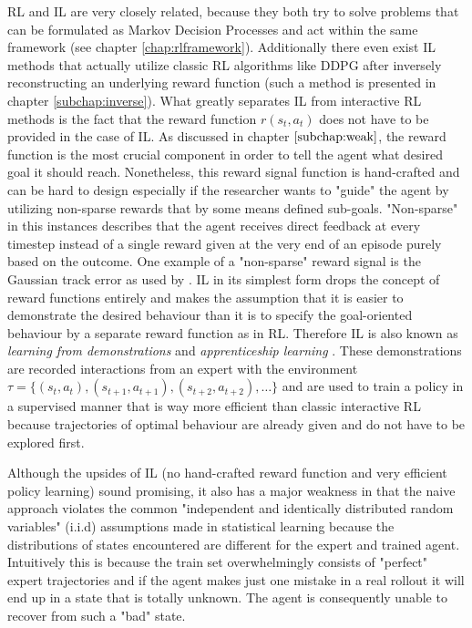 \par
RL and IL are very closely related, because they both try to solve problems that can be formulated as Markov Decision Processes and act within the same framework (see chapter \ref{chap:rlframework}). Additionally there even exist IL methods that actually utilize classic RL algorithms like DDPG after inversely reconstructing an underlying reward function (such a method is presented in chapter \ref{subchap:inverse}). What greatly separates IL from interactive RL methods is the fact that the reward function $r(s_t, a_t)$ does not have to be provided in the case of IL. As discussed in chapter $\ref{subchap:weak}$, the reward function is the most crucial component in order to tell the agent what desired goal it should reach. Nonetheless, this reward signal function is hand-crafted and can be hard to design especially if the researcher wants to "guide" the agent by utilizing non-sparse rewards  that by some means defined sub-goals. "Non-sparse" in this instances describes that the agent receives direct feedback at every timestep instead of a single reward given at the very end of an episode purely based on the outcome. One example of a "non-sparse" reward signal is the Gaussian track error as used by \cite{martinsen2018curved}.
IL in its simplest form drops the concept of reward functions entirely and makes the assumption that it is easier to demonstrate the desired behaviour than it is to specify the goal-oriented behaviour by a separate reward function as in RL. Therefore IL is also known as \textit{learning from demonstrations} and \textit{apprenticeship learning} \cite[p.~470]{Sutton1998}. These demonstrations are recorded interactions from an expert with the environment $\tau = \{(s_t, a_t), (s_{t+1}, a_{t+1}), (s_{t+2}, a_{t+2}), \dots\}$ and are used to train a policy in a supervised manner that is way more efficient than classic interactive RL because trajectories of optimal behaviour are already given and do not have to be explored first.
\par
Although the upsides of IL (no hand-crafted reward function and very efficient policy learning) sound promising, it also has a major weakness in that the naive approach violates the common "independent and identically distributed random variables" (i.i.d) assumptions made in statistical learning \cite{ross2011reduction} because the distributions of states encountered are different for the expert and trained agent. Intuitively this is because the train set overwhelmingly consists of "perfect" expert trajectories and if the agent makes just one mistake in a real rollout it will end up in a state that is totally unknown. The agent is consequently unable to recover from such a "bad" state.


